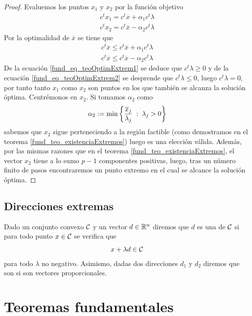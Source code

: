 \begin{proof}
	Evaluemos los puntos $x_1$ y $x_2$ por la función objetivo
	\begin{equation*}
		\begin{array}{c}
		c^tx_1=c^t\overline{x}+\alpha_1c^t\lambda\\
		c^tx_2=c^t\overline{x}-\alpha_2c^t\lambda
		\end{array}
	\end{equation*}
	Por la optimalidad de $\overline{x}$ se tiene que
	\begin{gather}
		\label{fund_eq_teoOptimExtrem1}c^t\overline{x}\leq c^t\overline{x}+\alpha_1c^t\lambda\\
		\label{fund_eq_teoOptimExtrem2}c^t\overline{x}\leq c^t\overline{x}-\alpha_2c^t\lambda
	\end{gather}
	De la ecuación \eqref{fund_eq_teoOptimExtrem1} se deduce que $c^t\lambda\geq 0$ y de la ecuación \eqref{fund_eq_teoOptimExtrem2} se desprende que $c^t\lambda\leq 0$, luego $c^t\lambda=0$, por tanto tanto $x_1$ como $x_2$ son puntos en los que también se alcanza la solución óptima. Centrémonos en $x_2$. Si tomamos $\alpha_2$ como
	\begin{equation*}
		\alpha_2:=\min\left\{\frac{\overline{x}_j}{\lambda_j}\;:\; \lambda_j>0\right\}
	\end{equation*}
	sabemos que $x_2$ sigue perteneciendo a la región factible (como demostramos en el teorema \ref{fund_teo_existenciaExtremos}) luego es una elección válida. Además, por las mismas razones que en el teorema \ref{fund_teo_existenciaExtremos}, el vector $x_2$ tiene a lo sumo $p-1$ componentes positivas, luego, tras un número finito de pasos encontraremos un punto extremo en el cual se alcance la solución óptima.
\end{proof}
\subsection{Direcciones extremas}
\begin{defi}[Dirección]
	Dado un conjunto convexo $\mathcal{C}$ y un vector $d\in\mathbb{R}^n$ diremos que $d$ es una  de $\mathcal{C}$ si para todo punto $x\in\mathcal{C}$ se verifica que
	\begin{equation*}
		x+\lambda d\in \mathcal{C}
	\end{equation*}
	para todo $\lambda$ no negativo. Asimismo, dadas dos direcciones $d_1$ y $d_2$ diremos que son  si son vectores proporcionales.
\end{defi}
\section{Teoremas fundamentales}